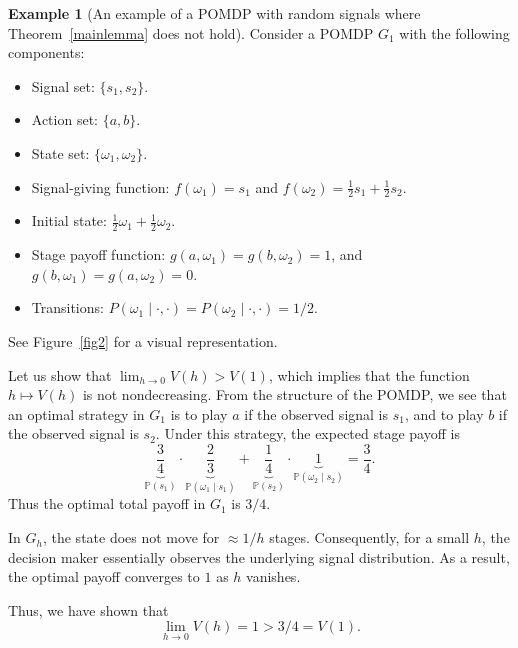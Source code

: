 \documentclass[english,openary,11pt]{article}
\theoremstyle{definition}
\newtheorem{example}{Example}
\renewcommand{\P}{\mathbb{P}}
\begin{document}
\begin{example}[An example of a POMDP with random signals where Theorem~\ref{mainlemma} does not hold]
\label{exam2}
Consider a POMDP $G_1$ with the following components:
\begin{itemize}
	\item Signal set: $\{s_1, s_2\}$.
	\item Action set: $\{a, b\}$.
	\item State set: $\{\omega_1, \omega_2\}$.
	\item Signal-giving function: $f(\omega_1) = s_1$ and $f(\omega_2) = \frac 1 2 s_1 + \frac 1 2 s_2$.
	\item Initial state: $\frac 1 2 \omega_1 + \frac 1 2 \omega_2$.
	\item Stage payoff function: $g(a,\omega_1) = g(b,\omega_2) = 1$, and $g(b,\omega_1) = g(a,\omega_2) = 0$.
	\item Transitions: $P(\omega_1 \mid \cdot,\cdot) = P(\omega_2 \mid \cdot, \cdot) = 1 / 2.$
\end{itemize}
See Figure~\ref{fig2} for a visual representation. 


Let us show that $\lim_{h \to 0} V(h) > V(1)$, which implies that the function $h \mapsto V(h)$ is not nondecreasing. From the structure of the POMDP, we see that an optimal strategy in $G_1$ is to play $a$ if the observed signal is $s_1$, and to play $b$ if the observed signal is $s_2$. Under this strategy, the expected stage payoff is 
\[
\underbrace{\frac 3 4}_{\P(s_1)} \cdot \underbrace{\frac 2 3}_{\P(\omega_1 \mid s_1)} + \underbrace{\frac 1 4}_{\P(s_2)} \cdot \underbrace{1}_{\P(\omega_2 \mid s_2)} = \frac 3 4.
\]
Thus the optimal total payoff in $G_1$ is $3/4$. 

In $G_h$, the state does not move for $\approx 1 / h$ stages. Consequently, for a small $h$, the decision maker essentially observes the underlying signal distribution. As a result, the optimal payoff converges to $1$ as $h$ vanishes.

Thus, we have shown that
\[\lim_{h \to 0} V(h) = 1 > 3/4 = V(1).\]
\end{example}
\end{document}
